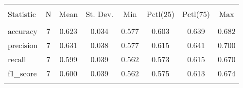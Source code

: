 
\begin{table}[!htbp] \centering 
  \caption{} 
  \label{} 
\begin{tabular}{@{\extracolsep{5pt}}lccccccc} 
\\[-1.8ex]\hline 
\hline \\[-1.8ex] 
Statistic & \multicolumn{1}{c}{N} & \multicolumn{1}{c}{Mean} & \multicolumn{1}{c}{St. Dev.} & \multicolumn{1}{c}{Min} & \multicolumn{1}{c}{Pctl(25)} & \multicolumn{1}{c}{Pctl(75)} & \multicolumn{1}{c}{Max} \\ 
\hline \\[-1.8ex] 
accuracy & 7 & 0.623 & 0.034 & 0.577 & 0.603 & 0.639 & 0.682 \\ 
precision & 7 & 0.631 & 0.038 & 0.577 & 0.615 & 0.641 & 0.700 \\ 
recall & 7 & 0.599 & 0.039 & 0.562 & 0.573 & 0.615 & 0.670 \\ 
f1\_score & 7 & 0.600 & 0.039 & 0.562 & 0.575 & 0.613 & 0.674 \\ 
\hline \\[-1.8ex] 
\end{tabular} 
\end{table} 
